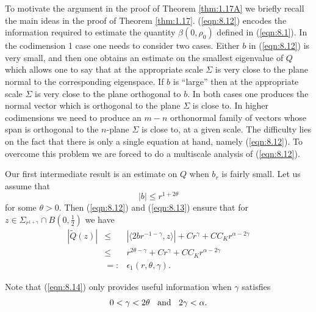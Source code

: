 \documentclass[12pt,leqno]{article}
\theoremstyle{plain}
\numberwithin{equation}{section}
\begin{document}
To motivate the argument in the proof of Theorem {\ref{thm:1.17A}} we briefly
recall the main ideas in the proof of Theorem {\ref{thm:1.17}}.
(\ref{eqn:8.12}) encodes the information
required to estimate the quantity $\beta(0,\rho_0)$ defined in
(\ref{eqn:8.1}). In the codimension 1 case one needs to consider two cases.
Either $b$ in (\ref{eqn:8.12}) is very small, and then one obtains an
estimate on the smallest eigenvalue of $Q$ which allows one to say that
at the appropriate scale $\Sigma$ is very close to the plane normal to the
corresponding eigenspace. If $b$ is ``large'' then
at the appropriate scale $\Sigma$ is very close to the plane orthogonal to
$b$. In both cases one produces the normal vector which is orthogonal to the
plane $\Sigma$ is close to. In higher codimensions we need to produce
an $m-n$ orthonormal family of vectors whose span is orthogonal
to the $n$-plane $\Sigma$ is close
to, at a given scale.
The difficulty lies on the fact that there is only a single equation
at hand, namely (\ref{eqn:8.12}). To overcome this problem
we are forced to do a multiscale analysis of (\ref{eqn:8.12}).




Our first intermediate result is an estimate on $Q$ when $b_r$ is fairly
small.
Let us assume that
\begin{equation}\label{eqn:8.13}
|b|\le r^{1+2\theta}
\end{equation}
for some $\theta>0$. Then (\ref{eqn:8.12}) and (\ref{eqn:8.13}) ensure that
for $z\in\Sigma_{r^{1+\gamma}}\cap B(0,\frac{1}{2})$ we have
\begin{eqnarray}\label{eqn:8.14}
|\widetilde Q(z)| & \le & |\langle 2br^{-1-\gamma}, z\rangle| + Cr^\gamma +
CC_Kr^{\alpha-2\gamma} \\
& \le & r^{2\theta-\gamma} + Cr^\gamma + CC_Kr^{\alpha-2\gamma} \nonumber
\\
& =: & \epsilon_1(r,\theta,\gamma). \nonumber
\end{eqnarray}


Note that (\ref{eqn:8.14}) only provides useful information when
$\gamma$ satisfies
\begin{equation}\label{eqn:8.15}
0<\gamma<2\theta\;\;\hbox{ and }\;\;2\gamma<\alpha.
\end{equation}
\end{document}
